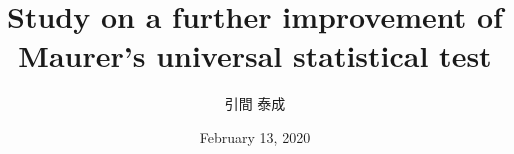 \documentclass[dvipdfmx,11pt]{beamer}
\title{Study on a further improvement of \\ Maurer's universal statistical test}
\subtitle{}
\date{February 13, 2020}
\author{引間 泰成}
\institute{京都大学大学院 情報学研究科 数理工学専攻 物理統計学分野}
\begin{document}
\begin{frame}[plain]\frametitle{}
\titlepage %
\end{frame}
\end{document}

